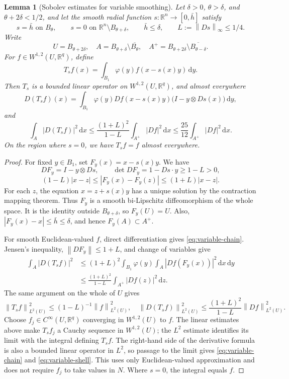 \documentclass[11pt,a4paper]{article}
\numberwithin{equation}{section}
\newtheorem{lemma}[theorem]{Lemma}
\theoremstyle{definition}
\newcommand{\R}{\mathbb R}
\newcommand{\dd}{\,\mathrm d}
\newcommand{\dx}{\dd x}
\newcommand{\dy}{\dd y}
\newcommand{\W}{W^{1,2}}
\newcommand{\norm}[1]{\left\lVert #1\right\rVert}
\begin{document}
\begin{lemma}[Sobolev estimates for variable smoothing]\label{lem:variable}
Let $\delta>0$, $\theta>\delta$, and $\theta+2\delta<1/2$, and let the smooth radial function $s:\R^n\to[0,\bar h]$ satisfy
\[
s=\bar h\text{ on }B_\theta,\qquad
s=0\text{ on }\R^n\setminus B_{\theta+\delta},\qquad
\bar h\le\delta,\qquad L:=\norm{Ds}_\infty\le1/4.
\]
Write
\[
U=B_{\theta+2\delta},\quad
A=B_{\theta+\delta}\setminus\overline{B_\theta},\quad
A^+=B_{\theta+2\delta}\setminus\overline{B_{\theta-\delta}}.
\]
For $f\in\W(U,\R^q)$, define
\[
T_sf(x)=\int_{B_1}\varphi(y)f(x-s(x)y)\dy.
\]
Then $T_s$ is a bounded linear operator on $\W(U,\R^q)$, and almost everywhere
\begin{equation}\label{eq:variable-chain}
D(T_sf)(x)=\int_{B_1}\varphi(y)Df(x-s(x)y)
\bigl(I-y\otimes Ds(x)\bigr)\dy,
\end{equation}
and
\begin{equation}\label{eq:variable-shell}
\int_A|D(T_sf)|^2\dx
\le\frac{(1+L)^2}{1-L}\int_{A^+}|Df|^2\dx
\le\frac{25}{12}\int_{A^+}|Df|^2\dx.
\end{equation}
On the region where $s=0$, we have $T_sf=f$ almost everywhere.
\end{lemma}
\begin{proof}
For fixed $y\in B_1$, set $F_y(x)=x-s(x)y$. We have
\[
DF_y=I-y\otimes Ds,\qquad\det DF_y=1-Ds\cdot y\ge1-L>0,
\]
\[
(1-L)|x-z|\le|F_y(x)-F_y(z)|\le(1+L)|x-z|.
\]
For each $z$, the equation $x=z+s(x)y$ has a unique solution by the contraction mapping theorem. Thus $F_y$ is a smooth bi-Lipschitz diffeomorphism of the whole space. It is the identity outside $B_{\theta+\delta}$, so $F_y(U)=U$. Also, $|F_y(x)-x|\le\bar h\le\delta$, and hence $F_y(A)\subset A^+$.

For smooth Euclidean-valued $f$, direct differentiation gives \eqref{eq:variable-chain}. Jensen's inequality, $\norm{DF_y}\le1+L$, and change of variables give
\begin{align*}
\int_A|D(T_sf)|^2
&\le(1+L)^2\int_{B_1}\varphi(y)
\int_A|Df(F_y(x))|^2\dx\dy\\
&\le\frac{(1+L)^2}{1-L}\int_{A^+}|Df(z)|^2\dd z.
\end{align*}
The same argument on the whole of $U$ gives
\[
\norm{T_sf}_{L^2(U)}^2\le(1-L)^{-1}\norm f_{L^2(U)}^2,
\quad
\norm{D(T_sf)}_{L^2(U)}^2
\le\frac{(1+L)^2}{1-L}\norm{Df}_{L^2(U)}^2.
\]
Choose $f_j\in C^\infty(U,\R^q)$ converging in $\W(U)$ to $f$. The linear estimates above make $T_sf_j$ a Cauchy sequence in $\W(U)$; the $L^2$ estimate identifies its limit with the integral defining $T_sf$. The right-hand side of the derivative formula is also a bounded linear operator in $L^2$, so passage to the limit gives \eqref{eq:variable-chain} and \eqref{eq:variable-shell}. This uses only Euclidean-valued approximation and does not require $f_j$ to take values in $N$. Where $s=0$, the integral equals $f$.
\end{proof}
\end{document}
